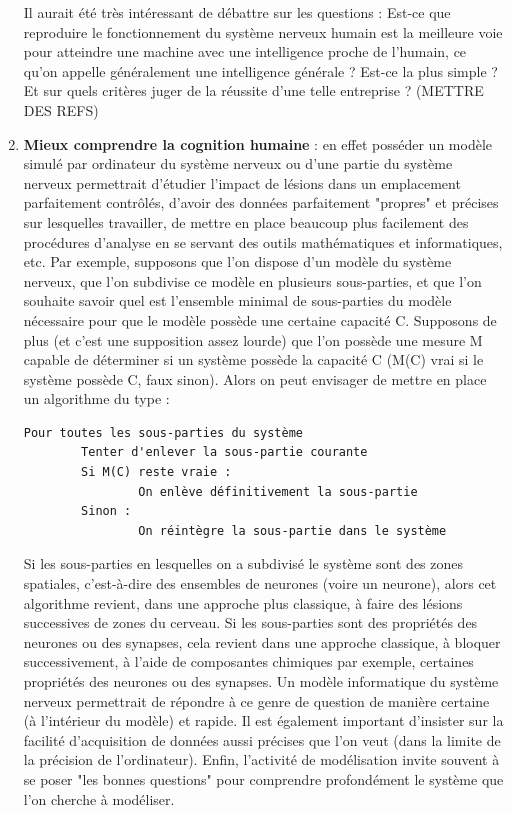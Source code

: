 \documentclass[12pt]{scrartcl}
\begin{document}
\begin{enumerate}
Il aurait été très intéressant de débattre sur les questions : Est-ce que reproduire le fonctionnement du système nerveux humain est la meilleure voie pour atteindre une machine avec une intelligence proche de l'humain, ce qu'on appelle généralement une intelligence générale ? Est-ce la plus simple ? Et sur quels critères juger de la réussite d'une telle entreprise ? (METTRE DES REFS) 
\item \textbf{Mieux comprendre la cognition humaine} : en effet posséder un modèle simulé par ordinateur du système nerveux ou d'une partie du système nerveux permettrait d'étudier l'impact de lésions dans un emplacement parfaitement contrôlés, d'avoir des données parfaitement "propres" et précises sur lesquelles travailler, de mettre en place beaucoup plus facilement des procédures d'analyse en se servant des outils mathématiques et informatiques, etc.
Par exemple, supposons que l'on dispose d'un modèle du système nerveux, que l'on subdivise ce modèle en plusieurs sous-parties, et que l'on souhaite savoir quel est l'ensemble minimal de sous-parties du modèle nécessaire pour que le modèle possède une certaine capacité C. Supposons de plus (et c'est une supposition assez lourde) que l'on possède une mesure M capable de déterminer si un système possède la capacité C (M(C) vrai si le système possède C, faux sinon). Alors on peut envisager de mettre en place un algorithme du type : 
\begin{verbatim}
Pour toutes les sous-parties du système 
        Tenter d'enlever la sous-partie courante 
        Si M(C) reste vraie : 
                On enlève définitivement la sous-partie 
        Sinon : 
                On réintègre la sous-partie dans le système
\end{verbatim}
Si les sous-parties en lesquelles on a subdivisé le système sont des zones spatiales, c'est-à-dire des ensembles de neurones (voire un neurone), alors cet algorithme revient, dans une approche plus classique, à faire des lésions successives de zones du cerveau. Si les sous-parties sont des propriétés des neurones ou des synapses, cela revient dans une approche classique, à bloquer successivement, à l'aide de composantes chimiques par exemple, certaines propriétés des neurones ou des synapses. 
Un modèle informatique du système nerveux permettrait de répondre à ce genre de question de manière certaine (à l'intérieur du modèle) et rapide. Il est également important d'insister sur la facilité d'acquisition de données aussi précises que l'on veut (dans la limite de la précision de l'ordinateur). Enfin, l'activité de modélisation invite souvent à se poser "les bonnes questions" pour comprendre profondément le système que l'on cherche à modéliser. \\ \end{enumerate}
\end{document}
